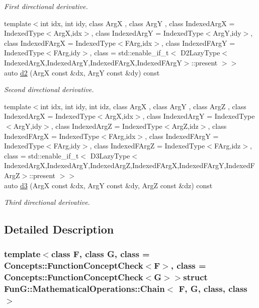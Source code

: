 \begin{DoxyCompactItemize}
\begin{DoxyCompactList}\small\item\em First directional derivative. \end{DoxyCompactList}\item 
{\footnotesize template$<$int idx, int idy, class Arg\-X , class Arg\-Y , class Indexed\-Arg\-X  = Indexed\-Type$<$\-Arg\-X,idx$>$, class Indexed\-Arg\-Y  = Indexed\-Type$<$\-Arg\-Y,idy$>$, class Indexed\-F\-Arg\-X  = Indexed\-Type$<$\-F\-Arg,idx$>$, class Indexed\-F\-Arg\-Y  = Indexed\-Type$<$\-F\-Arg,idy$>$, class  = std\-::enable\-\_\-if\-\_\-t$<$ D2\-Lazy\-Type$<$\-Indexed\-Arg\-X,\-Indexed\-Arg\-Y,\-Indexed\-F\-Arg\-X,\-Indexed\-F\-Arg\-Y$>$\-::present $>$$>$ }\\auto \hyperlink{structFunG_1_1MathematicalOperations_1_1Chain_a0ab88c09299ce967583408f7f7dcd2bb}{d2} (Arg\-X const \&dx, Arg\-Y const \&dy) const 
\begin{DoxyCompactList}\small\item\em Second directional derivative. \end{DoxyCompactList}\item 
{\footnotesize template$<$int idx, int idy, int idz, class Arg\-X , class Arg\-Y , class Arg\-Z , class Indexed\-Arg\-X  = Indexed\-Type$<$\-Arg\-X,idx$>$, class Indexed\-Arg\-Y  = Indexed\-Type$<$\-Arg\-Y,idy$>$, class Indexed\-Arg\-Z  = Indexed\-Type$<$\-Arg\-Z,idz$>$, class Indexed\-F\-Arg\-X  = Indexed\-Type$<$\-F\-Arg,idx$>$, class Indexed\-F\-Arg\-Y  = Indexed\-Type$<$\-F\-Arg,idy$>$, class Indexed\-F\-Arg\-Z  = Indexed\-Type$<$\-F\-Arg,idz$>$, class  = std\-::enable\-\_\-if\-\_\-t$<$ D3\-Lazy\-Type$<$\-Indexed\-Arg\-X,\-Indexed\-Arg\-Y,\-Indexed\-Arg\-Z,\-Indexed\-F\-Arg\-X,\-Indexed\-F\-Arg\-Y,\-Indexed\-F\-Arg\-Z$>$\-::present $>$$>$ }\\auto \hyperlink{structFunG_1_1MathematicalOperations_1_1Chain_a17ac1618545b9d9bd2efa873b36cfbc7}{d3} (Arg\-X const \&dx, Arg\-Y const \&dy, Arg\-Z const \&dz) const 
\begin{DoxyCompactList}\small\item\em Third directional derivative. \end{DoxyCompactList}\end{DoxyCompactItemize}


\subsection{Detailed Description}
\subsubsection*{template$<$class F, class G, class = Concepts\-::\-Function\-Concept\-Check$<$\-F$>$, class = Concepts\-::\-Function\-Concept\-Check$<$\-G$>$$>$struct Fun\-G\-::\-Mathematical\-Operations\-::\-Chain$<$ F, G, class, class $>$}

